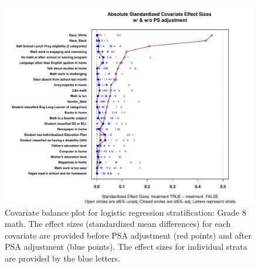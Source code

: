 \begin{figure}[h!]
\begin{center}
\includegraphics[width=\textwidth]{../Figures2009/g8math-lr-balance.pdf}
\caption[Covariate balance plot for logistic regression stratification: Grade 8 math]{Covariate balance plot for logistic regression stratification: Grade 8 math. The effect sizes (standardized mean differences) for each covariate are provided before PSA adjustment (red points) and after PSA adjustment (blue points). The effect sizes for individual strata are provided by the blue letters.}
\end{center}
\end{figure}

